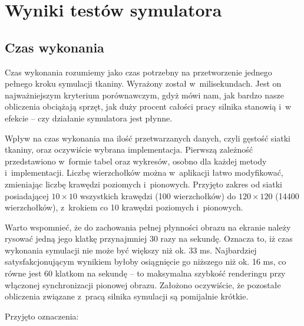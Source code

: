 \chapter{Wyniki testów symulatora}
\label{t:wyniki}

	\section{Czas wykonania}
	\label{t:wyniki:czas_wykonania}

		Czas wykonania rozumiemy jako czas potrzebny na przetworzenie jednego pełnego kroku symulacji tkaniny. Wyrażony został w~milisekundach. Jest on najważniejszym kryterium porównawczym, gdyż mówi nam, jak bardzo nasze obliczenia obciążają sprzęt, jak duży procent całości pracy silnika stanowią i~w efekcie -- czy działanie symulatora jest płynne. 
		
		Wpływ na czas wykonania ma ilość przetwarzanych danych, czyli gęstość siatki tkaniny, oraz oczywiście wybrana implementacja. Pierwszą zależność przedstawiono w~formie tabel oraz wykresów, osobno dla każdej metody i~implementacji. Liczbę wierzchołków można w~aplikacji łatwo modyfikować, zmieniając liczbę krawędzi poziomych i~pionowych. Przyjęto zakres od siatki posiadającej \(10 \times 10 \) wszystkich krawędzi (100 wierzchołków) do \( 120 \times 120 \) (14400 wierzchołków), z~krokiem co 10 krawędzi poziomych i~pionowych.
		
		Warto wspomnieć, że do zachowania pełnej płynności obrazu na ekranie należy rysować jedną jego klatkę przynajmniej 30 razy na sekundę. Oznacza to, iż czas wykonania symulacji nie może być większy niż ok. 33 ms. Najbardziej satysfakcjonującym wynikiem byłoby osiągnięcie go niższego niż ok. 16 ms, co równe jest 60 klatkom na sekundę -- to maksymalna szybkość renderingu przy włączonej synchronizacji pionowej obrazu. Założono oczywiście, że pozostałe obliczenia związane z~pracą silnika symulacji są pomijalnie krótkie.
		
		Przyjęto oznaczenia:
		

